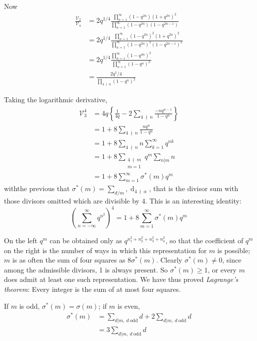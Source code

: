 Now\pageoriginale 
\begin{align*}
  \frac{\mathscr{V}_2}{\mathscr{V}_4} & = 2 q^{1/4}
  \frac{\prod\limits^\infty_{n=1} (1- q^{2n}) (1+
    q^{2n})^2}{\prod\limits^\infty_{n=1}(1-q^{2n})(1-q^{2n-1})}\\
  &= 2 q^{1/4}  \frac{\prod\limits^\infty_{n=1} (1- q^{2n})^2 (1+
    q^{2n})^2}{\prod\limits^\infty_{n=1}(1-q^{2n})^2 (1-q^{2n-1})^2}\\
  & =2 q^{1/4} \frac{\prod\limits^\infty_{n=1} (1- q^{4n})^2}
       {\prod\limits^\infty_{n=1}(1-q^{n})^2}\\
  & = \frac{2q^1/4}{\prod\limits_{4 ~\nmid~ n}(1-q^n)^2}     
\end{align*}

Taking the logarithmic derivative,
\begin{align*}
  \mathscr{V}_3^4 & = 4q \left\{ \frac{1}{4q} -2 \sum_{4 ~\nmid~
    n} \frac{-n q^{n-1}}{1- q^n}\right\}\\
  & = 1+ 8 \sum_{4 ~\nmid~ n} \frac{n q^n}{1-q^n}\\
  & = 1+ 8 \sum_{4 ~\nmid~ n} n\sum^\infty_{k=1} q^{nk}\\
  & = 1+ 8 \sum_{\substack{4 ~\nmid~ m\\m=1}} q^{m} \sum_{n|m}n\\
  & = 1+ 8 \sum^\infty_{m=1} \sigma^* (m) q^m
\end{align*}
with\pageoriginale the previous that $\displaystyle{\sigma^* (m) = \sum_{d/m},
\mathop{d}_{4 ~\nmid~\alpha}}$, that is the divisor sum with those\break
divisors omitted which are divisible by 4. This is an interesting identity:
\begin{equation*}
  \left( \sum^\infty_{n=-\infty} q^{n^2}\right)^4 = 1+8
  \sum^\infty_{m=1} \sigma^* (m) q^m \tag{4}\label{part2:lec11:eq4}
\end{equation*}

On the left $q^m$ can be obtained only as $q^{n_1^2+ n_2^2 + n_3^2+
  n_4^2}$, so that the coefficient of $q^m$ on the right is the number
of ways in which this representation for $m$ is possible; $m$ is as
often the sum of four squares as $8 \sigma^* (m)$. Clearly $\sigma^*
(m) \neq 0$, since among the admissible divisors, 1 is always
present. So $\sigma^* (m) \geq 1$, or every $m$ does admit at least
one such representation. We have thus proved \textit{Lagrange's
  theorem}: Every integer is the sum of at most four squares. 

If $m$ is odd, $\sigma^* (m) = \sigma (m)$; if $m$ is even, 
\begin{align*}
  \sigma^* (m) & = \sum_{d|m, ~d~\text{odd}} d + 2 \sum_{d|m,~
    d~\text{odd}}d\\
  & = 3 \sum_{d|m, ~d~\text{odd}} d
\end{align*}

